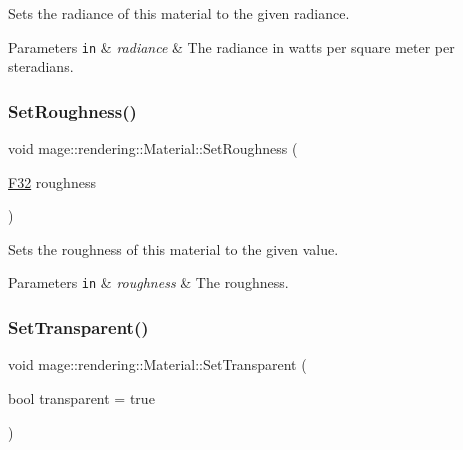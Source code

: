 Sets the radiance of this material to the given radiance.


\begin{DoxyParams}[1]{Parameters}
\mbox{\tt in}  & {\em radiance} & The radiance in watts per square meter per steradians. \\
\hline
\end{DoxyParams}
\hypertarget{classmage_1_1rendering_1_1_material_a1504fb6523526ee9897b20851a3b84e9}{}\label{classmage_1_1rendering_1_1_material_a1504fb6523526ee9897b20851a3b84e9} 
\subsubsection{\texorpdfstring{Set\+Roughness()}{SetRoughness()}}
{\footnotesize\ttfamily void mage\+::rendering\+::\+Material\+::\+Set\+Roughness (\begin{DoxyParamCaption}\item[{\hyperlink{namespacemage_aa97e833b45f06d60a0a9c4fc22ae02c0}{F32}}]{roughness }\end{DoxyParamCaption})\hspace{0.3cm}{\ttfamily [noexcept]}}

Sets the roughness of this material to the given value.


\begin{DoxyParams}[1]{Parameters}
\mbox{\tt in}  & {\em roughness} & The roughness. \\
\hline
\end{DoxyParams}
\hypertarget{classmage_1_1rendering_1_1_material_a8da0e0ed4df1e9ce0c7381d88b6d6c48}{}\label{classmage_1_1rendering_1_1_material_a8da0e0ed4df1e9ce0c7381d88b6d6c48} 
\subsubsection{\texorpdfstring{Set\+Transparent()}{SetTransparent()}}
{\footnotesize\ttfamily void mage\+::rendering\+::\+Material\+::\+Set\+Transparent (\begin{DoxyParamCaption}\item[{bool}]{transparent = {\ttfamily true} }\end{DoxyParamCaption})\hspace{0.3cm}{\ttfamily [noexcept]}}

